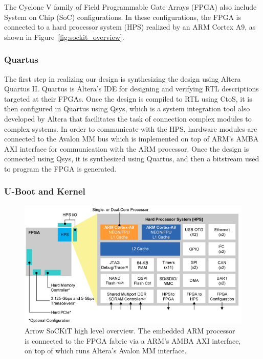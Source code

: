 \documentclass{sig-alternate-10pt}
\begin{document}
The Cyclone V family of Field Programmable Gate Arrays (FPGA) also include
System on Chip (SoC) configurations. In these configurations, the FPGA is
connected to a hard processor system (HPS) realized by an ARM Cortex A9, as
shown in Figure~\ref{fig:sockit_overview}.

\subsubsection{Quartus}
The first step in realizing our design is synthesizing the design using Altera Quartus II. Quartus is Altera's IDE for designing and verifying RTL descriptions targeted at their FPGAs. Once the design is compiled to RTL using CtoS, it is then configured in Quartus using Qsys, which is a system integration tool also developed by Altera that facilitates the task of connection complex modules to complex systems. In order to communicate with the HPS, hardware modules are connected to the Avalon MM bus which is implemented on top of ARM's AMBA AXI interface for communication with the ARM processor. Once the design is connected using Qsys, it is synthesized using Quartus, and then a bitstream used to program the FPGA is generated.

\subsubsection{U-Boot and Kernel}
\begin{figure}
	\begin{center}
		\includegraphics[width=0.9\linewidth]{fig/soc_cyclonev.png}
		\caption{
			Arrow SoCKiT high level overview. The embedded ARM processor is connected to the FPGA fabric via a ARM's AMBA AXI interface, on top of which runs Altera's Avalon MM interface.
		}
		\label{fig:cyclone_diag}
	\end{center}
\end{figure}
\end{document}
